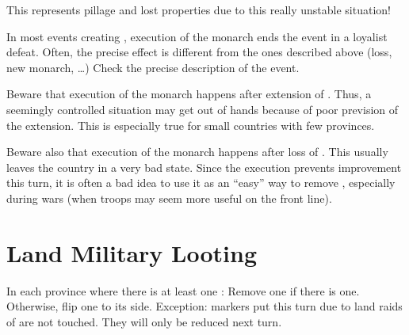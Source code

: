 \begin{designnote}
  This represents pillage and lost properties due to this really unstable
  situation!
\end{designnote}

\bparag In most events creating \REBELLION, execution of the monarch ends the
event in a loyalist defeat. Often, the precise effect is different from the
ones described above (\STAB loss, new monarch, \ldots) Check the precise
description of the event.

\begin{playtip}
  Beware that execution of the monarch happens after extension of
  \REVOLT. Thus, a seemingly controlled situation may get out of hands because
  of poor prevision of the extension. This is especially true for small
  countries with few provinces.

  Beware also that execution of the monarch happens after loss of \STAB. This
  usually leaves the country in a very bad state. Since the execution prevents
  \STAB improvement this turn, it is often a bad idea to use it as an ``easy''
  way to remove \REVOLT, especially during wars (when troops may seem more
  useful on the front line).
\end{playtip}


\section{Land Military Looting}\label{chRedep:Looting}

 In each
province where there is at least one \PILLAGE:
\bparag Remove one \PILLAGE\Facemoins if there is one.
\bparag Otherwise, flip one \PILLAGE\Faceplus to its \Facemoins side.
\bparag Exception: \PILLAGE markers put this turn due to land raids of
\corsaire are not touched. They will only be reduced next turn.

